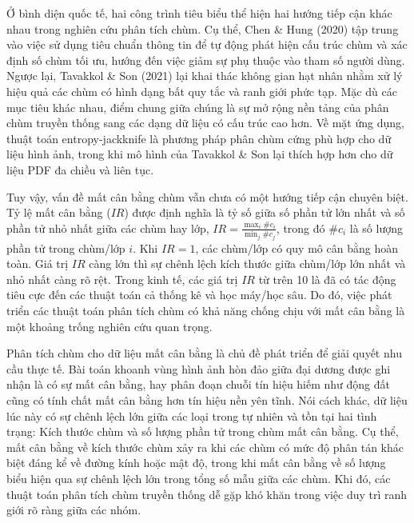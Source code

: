 \documentclass[a4paper,oneside]{book} %
\theoremstyle{plain}
\theoremstyle{plain}
\theoremstyle{nonumberplain}
\begin{document}
Ở bình diện quốc tế, hai công trình tiêu biểu thể hiện hai hướng tiếp cận khác nhau trong nghiên cứu phân tích chùm. Cụ thể, Chen \& Hung (2020) \cite{chen2021jackknife} tập trung vào việc sử dụng tiêu chuẩn thông tin để tự động phát hiện cấu trúc chùm và xác định số chùm tối ưu, hướng đến việc giảm sự phụ thuộc vào tham số người dùng. Ngược lại, Tavakkol \& Son (2021) \cite{tavakkol2021fuzzy} lại khai thác không gian hạt nhân nhằm xử lý hiệu quả các chùm có hình dạng bất quy tắc và ranh giới phức tạp.
Mặc dù các mục tiêu khác nhau, điểm chung giữa chúng là sự mở rộng nền tảng của phân chùm truyền thống sang các dạng dữ liệu có cấu trúc cao hơn. Về mặt ứng dụng, thuật toán entropy-jackknife là phương pháp phân chùm cứng phù hợp cho dữ liệu hình ảnh, trong khi mô hình của Tavakkol \& Son lại thích hợp hơn cho dữ liệu PDF đa chiều và liên tục.



Tuy vậy, vấn đề mất cân bằng chùm vẫn chưa có một hướng tiếp cận chuyên biệt. Tỷ lệ mất cân bằng ($IR$)  được định nghĩa là tỷ số giữa số phần tử lớn nhất và số phần tử nhỏ nhất giữa các chùm hay lớp, $
IR = \frac{\max_i\#c_i}{\min_j \#c_j}$, trong đó $\#c_i$ là số lượng phần tử trong chùm/lớp $i$. Khi $IR=1$, các chùm/lớp có quy mô cân bằng hoàn toàn. Giá trị $IR$ càng lớn thì sự chênh lệch kích thước giữa chùm/lớp lớn nhất và nhỏ nhất càng rõ rệt. Trong kinh tế, các giá trị $IR$ từ trên 10 là đã có tác động tiêu cực đến các thuật toán cả thống kê và học máy/học sâu. Do đó, việc phát triển các thuật toán phân tích chùm có khả năng chống chịu với mất cân bằng là một khoảng trống nghiên cứu quan trọng.


Phân tích chùm cho dữ liệu mất cân bằng là chủ đề phát triển để giải quyết nhu cầu thực tế. Bài toán khoanh vùng hình ảnh hòn đảo giữa đại dương được ghi nhận là có sự mất cân bằng, hay phân đoạn chuỗi tín hiệu hiếm như động đất cũng có tính chất mất cân bằng hơn tín hiệu nền yên tĩnh. Nói cách khác, dữ liệu lúc này có sự chênh lệch lớn giữa các loại trong tự nhiên và tồn tại hai tình trạng: Kích thước chùm và số lượng phần tử trong chùm mất cân bằng. 
Cụ thể, mất cân bằng về kích thước chùm xảy ra khi các chùm có mức độ phân tán khác biệt đáng kể về đường kính hoặc mật độ, trong khi mất cân bằng về số lượng biểu hiện qua sự chênh lệch lớn trong tổng số mẫu giữa các chùm. Khi đó, các thuật toán phân tích chùm truyền thống dễ gặp khó khăn trong việc duy trì ranh giới rõ ràng giữa các nhóm.
\end{document}
